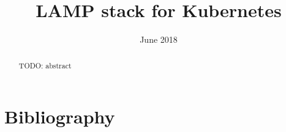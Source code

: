 \documentclass[licencjacka,en]{pracamgr}
\title{LAMP stack for Kubernetes}
\date{June 2018}
\begin{document}
  \maketitle

  \begin{abstract}
  TODO: abstract
  \end{abstract}

  \tableofcontents

  
  
  
  
  
  

  \chapter*{Bibliography}
  \printbibliography[heading=none]
\end{document}
